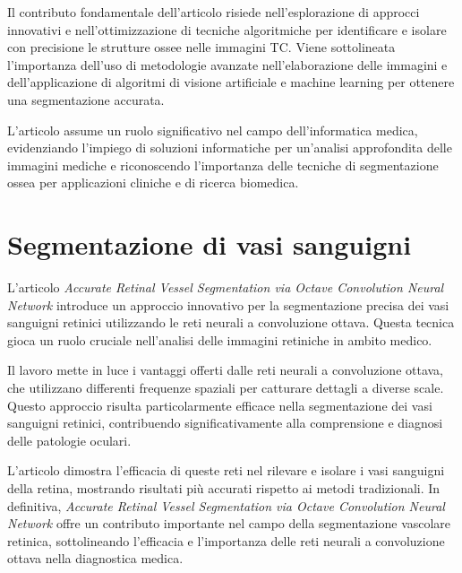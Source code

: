 Il contributo fondamentale dell'articolo risiede nell'esplorazione di approcci innovativi e
nell'ottimizzazione di tecniche algoritmiche per identificare e isolare con precisione le strutture
ossee nelle immagini TC. Viene sottolineata l'importanza dell'uso di metodologie avanzate
nell'elaborazione delle immagini e dell'applicazione di algoritmi di visione artificiale e machine
learning per ottenere una segmentazione accurata.

L'articolo assume un ruolo significativo nel campo dell'informatica medica, evidenziando l'impiego
di soluzioni informatiche per un'analisi approfondita delle immagini mediche e riconoscendo
l'importanza delle tecniche di segmentazione ossea per applicazioni cliniche e di ricerca biomedica.


\section{Segmentazione di vasi sanguigni} \label{sec:segmentazione_vasi_sanguigni}

L'articolo \textit{Accurate Retinal Vessel Segmentation via Octave Convolution Neural Network}
\cite{fan2020accurate} introduce un approccio innovativo per la segmentazione precisa dei vasi
sanguigni retinici utilizzando le reti neurali a convoluzione ottava. Questa tecnica gioca un ruolo
cruciale nell'analisi delle immagini retiniche in ambito medico.

Il lavoro mette in luce i vantaggi offerti dalle reti neurali a convoluzione ottava, che utilizzano
differenti frequenze spaziali per catturare dettagli a diverse scale. Questo approccio risulta
particolarmente efficace nella segmentazione dei vasi sanguigni retinici, contribuendo
significativamente alla comprensione e diagnosi delle patologie oculari.

L'articolo dimostra l'efficacia di queste reti nel rilevare e isolare i vasi sanguigni della retina,
mostrando risultati più accurati rispetto ai metodi tradizionali. In definitiva, \textit{Accurate
Retinal Vessel Segmentation via Octave Convolution Neural Network} offre un contributo importante
nel campo della segmentazione vascolare retinica, sottolineando l'efficacia e l'importanza delle
reti neurali a convoluzione ottava nella diagnostica medica.
